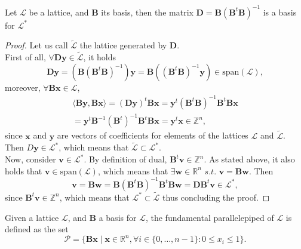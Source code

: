 \begin{theorem}
Let $\mathscr{L}$ be a lattice, and $\mathbf{B}$ its basis, then the matrix $\mathbf{D}=\mathbf{B}(\mathbf{B}^{t}\mathbf{B})^{-1}$ is a basis for $\mathscr{L}^*$
\end{theorem}
\begin{proof}
Let us call $\tilde{\mathscr{L}}$ the lattice generated by $\mathbf{D}$.\\
First of all, $\forall{\mathbf{Dy}} \in \tilde{\mathscr{L}}$, it holds
\begin{equation*}
\mathbf{Dy} = (\mathbf{B}(\mathbf{B}^{t}\mathbf{B})^{-1})\mathbf{y} = \mathbf{B}((\mathbf{B}^{t}\mathbf{B})^{-1}\mathbf{y}) \in \mathrm{span}(\mathscr{L}),
\end{equation*}
moreover, $\forall \mathbf{Bx}\in\mathscr{L}$,
\begin{equation*}
\begin{aligned}
\langle \mathbf{By},\mathbf{Bx} \rangle = (\mathbf{Dy})^{t}\mathbf{Bx} = \mathbf{y}^{t} (\mathbf{B}^t\mathbf{B})^{-1}\mathbf{B}^t\mathbf{B}\mathbf{x}\\
= \mathbf{y}^{t} \mathbf{B}^{-1}(\mathbf{B}^t)^{-1}\mathbf{B}^t\mathbf{Bx} = \mathbf{y}^t\mathbf{x} \in \mathbb{Z}^n,
\end{aligned}
\end{equation*}
since $\mathbf{x}$ and $\mathbf{y}$ are vectors of coefficients for elements of the lattices $\mathscr{L}$ and $\tilde{\mathscr{L}}$. Then $D\mathbf{y}\in\mathscr{L}^*$, which means that $\tilde{\mathscr{L}}\subset\mathscr{L}^*$.\\
Now, consider $\mathbf{v}\in\mathscr{L}^*$. By definition of dual, $\mathbf{B}^t\mathbf{v}\in\mathbb{Z}^n$. As stated above, it also holds that $\mathbf{v}\in \mathrm{span}(\mathscr{L})$, which means that $\exists\mathbf{w}\in\mathbb{R}^n$ $s.t.$ $\mathbf{v}=\mathbf{Bw}$. Then
\begin{equation*}
\mathbf{v} = \mathbf{Bw} = \mathbf{B}(\mathbf{B}^t\mathbf{B})^{-1}\mathbf{B}^t\mathbf{B}\mathbf{w} = \mathbf{DB}^t\mathbf{v} \in \mathscr{L}^*,
\end{equation*}
since $\mathbf{B}^t\mathbf{v}\in\mathbb{Z}^n$, which means that $\mathscr{L}^*\subset\tilde{\mathscr{L}}$ thus concluding the proof.
\end{proof}

\begin{definition}
Given a lattice $\mathscr{L}$, and $\mathbf{B}$ a basis for $\mathscr{L}$, the fundamental parallelepiped of $\mathscr{L}$ is defined as the set
\begin{equation*}
\mathscr{P} = \{\mathbf{Bx}\mid\mathbf{x}\in\mathbb{R}^n, \forall i \in \{0,\ldots,n-1\}:0\leq x_i \leq 1 \}.
\end{equation*}
\end{definition}

